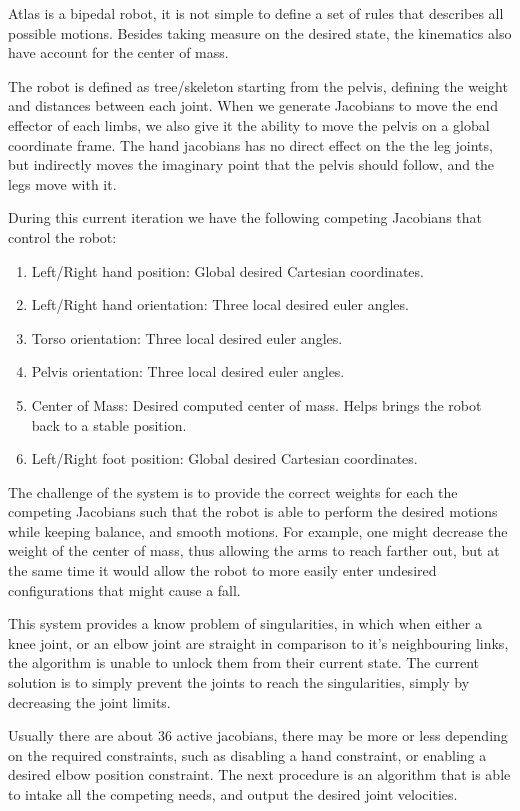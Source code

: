 \documentclass[12pt]{report}
\begin{document}
Atlas is a bipedal robot, it is not simple to define a set of rules that describes all possible motions. Besides taking measure on the desired state, the kinematics also have account for the center of mass.

The robot is defined as tree/skeleton starting from the pelvis, defining the weight and distances between each joint. When we generate Jacobians to move the end effector of each limbs, we also give it the ability to move the pelvis on a global coordinate frame. The hand jacobians has no direct effect on the the leg joints, but indirectly moves the imaginary point that the pelvis should follow, and the legs move with it. 

During this current iteration we have the following competing Jacobians that control the robot: 
\begin{enumerate}
\item Left/Right hand position: Global desired Cartesian coordinates.
\item Left/Right hand orientation: Three local desired euler angles.
\item Torso orientation: Three local desired euler angles.
\item Pelvis orientation: Three local desired euler angles.
\item Center of Mass: Desired computed center of mass. Helps brings the robot back to a stable position.
\item Left/Right foot position: Global desired Cartesian coordinates.
\end{enumerate}

The challenge of the system is to provide the correct weights for each the competing Jacobians such that the robot is able to perform the desired motions while keeping balance, and smooth motions. For example, one might decrease the weight of the center of mass, thus allowing the arms to reach farther out, but at the same time it would allow the robot to more easily enter undesired configurations that might cause a fall.

This system provides a know problem of singularities, in which when either a knee joint, or an elbow joint are straight in comparison to it's neighbouring links, the algorithm is unable to unlock them from their current state. The current solution is to simply prevent the joints to reach the singularities, simply by decreasing the joint limits. 

Usually there are about 36 active jacobians, there may be more or less depending on the required constraints, such as disabling a hand constraint, or enabling a desired elbow position constraint. The next procedure is an algorithm that is able to intake all the competing needs, and output the desired joint velocities. 
\end{document}
